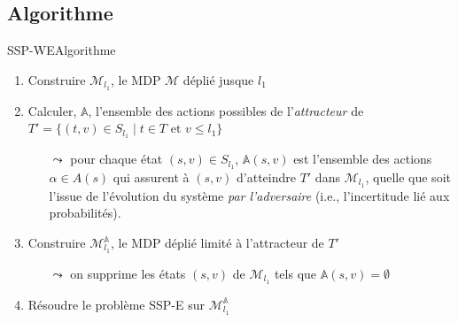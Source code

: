 \documentclass[compress]{beamer}
\begin{document}
\subsection{Algorithme}
\begin{frame}{SSP-WE}{Algorithme}
  \begin{enumerate}
    \item Construire $\mathcal{M}_{l_1}$, le MDP $\mathcal{M}$ déplié jusque $l_1$
    \item Calculer, $\mathbb{A}$, l'ensemble des actions possibles de l'\textit{\color{fibeamer@orange}attracteur} de $T' = \{ (t, v) \in S_{l_1} \; | \; t \in T \text{ et } v \leq l_1\}$
    \begin{itemize}
      \item[$\leadsto$] pour chaque état $(s, v) \in S_{l_1}$, $\mathbb{A}(s, v)$ est l'ensemble des actions $\alpha \in A(s)$ qui assurent à $(s, v)$ d'atteindre $T'$ dans $\mathcal{M}_{l_1}$, quelle que soit l'issue de l'évolution du système \textit{par l'adversaire} (i.e., l'incertitude lié aux probabilités).
    \end{itemize}
    \item Construire $\mathcal{M}^{\mathbb{A}}_{l_1}$, le MDP déplié limité à l'attracteur de $T'$
    \begin{itemize}
      \item[$\leadsto$] on supprime les états $(s, v)$ de $\mathcal{M}_{l_1}$ tels que $\mathbb{A}(s, v) = \emptyset$
    \end{itemize}
    \item Résoudre le problème SSP-E sur $\mathcal{M}_{l_1}^\mathbb{A}$
  \end{enumerate}
\end{frame}
\end{document}
